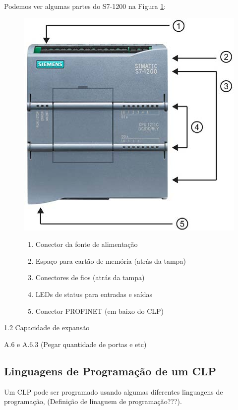 \documentclass[a4paper, 12pt]{article}
\begin{document}
			Podemos ver algumas partes do S7-1200 na Figura \ref{fig:s7-1200-parts}:
			
			\begin{figure}[H]
				\centering
				\begin{minipage}{.5\textwidth}
			  		\centering
			  		\includegraphics[width=.65\linewidth]{figures/s7-1200_parts.png}
				  \label{fig:s7-1200-parts}
				\end{minipage}%
				\begin{minipage}{.5\textwidth}
			  		\centering
			  		\begin{enumerate}
			  			\item Conector da fonte de alimentação
			  			\item Espaço para cartão de memória (atrás da tampa)
			  			\item Conectores de fios (atrás da tampa)
			  			\item LEDs de status para entradas e saídas
			  			\item Conector PROFINET (em baixo do CLP)
			  		\end{enumerate}
				\end{minipage}
			\end{figure}
		
			1.2 Capacidade de expansão
		
			A.6 e A.6.3 (Pegar quantidade de portas e etc)

	\subsection{Linguagens de Programação de um CLP}
	
		Um CLP pode ser programado usando algumas diferentes linguagens de programação, (Definição de linaguem de programação???).
		
\end{document}
